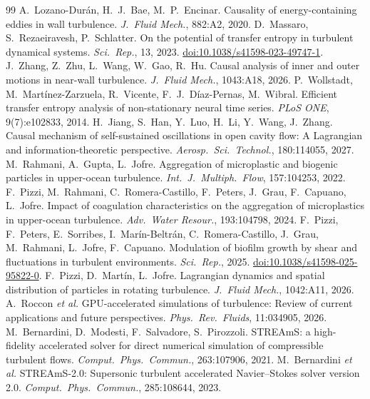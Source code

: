 \documentclass[11pt]{article}
\begin{document}
\begin{thebibliography}{99}
 A.\ Lozano-Dur\'an, H.\ J.\ Bae, M.\ P.\ Encinar. Causality of energy-containing eddies in wall turbulence. \emph{J.\ Fluid Mech.}, 882:A2, 2020.
 D.\ Massaro, S.\ Rezaeiravesh, P.\ Schlatter. On the potential of transfer entropy in turbulent dynamical systems. \emph{Sci.\ Rep.}, 13, 2023. \href{https://doi.org/10.1038/s41598-023-49747-1}{doi:10.1038/s41598-023-49747-1}.
 J.\ Zhang, Z.\ Zhu, L.\ Wang, W.\ Gao, R.\ Hu. Causal analysis of inner and outer motions in near-wall turbulence. \emph{J.\ Fluid Mech.}, 1043:A18, 2026.
 P.\ Wollstadt, M.\ Mart\'inez-Zarzuela, R.\ Vicente, F.\ J.\ D\'iaz-Pernas, M.\ Wibral. Efficient transfer entropy analysis of non-stationary neural time series. \emph{PLoS ONE}, 9(7):e102833, 2014.
 H.\ Jiang, S.\ Han, Y.\ Luo, H.\ Li, Y.\ Wang, J.\ Zhang. Causal mechanism of self-sustained oscillations in open cavity flow: A Lagrangian and information-theoretic perspective. \emph{Aerosp.\ Sci.\ Technol.}, 180:114055, 2027.
 M.\ Rahmani, A.\ Gupta, L.\ Jofre. Aggregation of microplastic and biogenic particles in upper-ocean turbulence. \emph{Int.\ J.\ Multiph.\ Flow}, 157:104253, 2022.
 F.\ Pizzi, M.\ Rahmani, C.\ Romera-Castillo, F.\ Peters, J.\ Grau, F.\ Capuano, L.\ Jofre. Impact of coagulation characteristics on the aggregation of microplastics in upper-ocean turbulence. \emph{Adv.\ Water Resour.}, 193:104798, 2024.
 F.\ Pizzi, F.\ Peters, E.\ Sorribes, I.\ Mar\'in-Beltr\'an, C.\ Romera-Castillo, J.\ Grau, M.\ Rahmani, L.\ Jofre, F.\ Capuano. Modulation of biofilm growth by shear and fluctuations in turbulent environments. \emph{Sci.\ Rep.}, 2025. \href{https://doi.org/10.1038/s41598-025-95822-0}{doi:10.1038/s41598-025-95822-0}.
 F.\ Pizzi, D.\ Mart\'in, L.\ Jofre. Lagrangian dynamics and spatial distribution of particles in rotating turbulence. \emph{J.\ Fluid Mech.}, 1042:A11, 2026.
 A.\ Roccon \emph{et al.} GPU-accelerated simulations of turbulence: Review of current applications and future perspectives. \emph{Phys.\ Rev.\ Fluids}, 11:034905, 2026.
 M.\ Bernardini, D.\ Modesti, F.\ Salvadore, S.\ Pirozzoli. STREAmS: a high-fidelity accelerated solver for direct numerical simulation of compressible turbulent flows. \emph{Comput.\ Phys.\ Commun.}, 263:107906, 2021.
 M.\ Bernardini \emph{et al.} STREAmS-2.0: Supersonic turbulent accelerated Navier--Stokes solver version 2.0. \emph{Comput.\ Phys.\ Commun.}, 285:108644, 2023.

\end{thebibliography}
\end{document}
